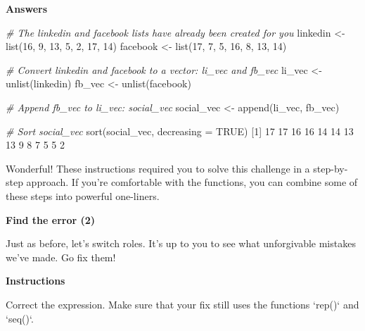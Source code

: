 \documentclass[]{article}
\newcommand{\hlnum}[1]{\textcolor[rgb]{0.816,0.125,0.439}{#1}}%
\newcommand{\hlstr}[1]{\textcolor[rgb]{0.251,0.627,0.251}{#1}}%
\newcommand{\hlcom}[1]{\textcolor[rgb]{0.502,0.502,0.502}{\textit{#1}}}%
\newcommand{\hlstd}[1]{\textcolor[rgb]{0.251,0.251,0.251}{#1}}%
\newcommand{\hlkwc}[1]{\textcolor[rgb]{0.251,0.251,0.251}{#1}}%
\newcommand{\hlkwd}[1]{\textcolor[rgb]{0.878,0.439,0.125}{#1}}%
\newenvironment{Shaded}{\begin{myshaded}}{\end{myshaded}}
\newcommand{\KeywordTok}[1]{\hlkwd{#1}}
\newcommand{\DataTypeTok}[1]{\hlkwc{#1}}
\newcommand{\DecValTok}[1]{\hlnum{#1}}
\newcommand{\StringTok}[1]{\hlstr{#1}}
\newcommand{\CommentTok}[1]{\hlcom{#1}}
\newcommand{\OtherTok}[1]{{#1}}
\newcommand{\NormalTok}[1]{\hlstd{#1}}
\begin{document}
\textbf{Answers}

\begin{Shaded}
\begin{Highlighting}[]
\CommentTok{# The linkedin and facebook lists have already been created for you}
\NormalTok{linkedin <-}\StringTok{ }\KeywordTok{list}\NormalTok{(}\DecValTok{16}\NormalTok{, }\DecValTok{9}\NormalTok{, }\DecValTok{13}\NormalTok{, }\DecValTok{5}\NormalTok{, }\DecValTok{2}\NormalTok{, }\DecValTok{17}\NormalTok{, }\DecValTok{14}\NormalTok{)}
\NormalTok{facebook <-}\StringTok{ }\KeywordTok{list}\NormalTok{(}\DecValTok{17}\NormalTok{, }\DecValTok{7}\NormalTok{, }\DecValTok{5}\NormalTok{, }\DecValTok{16}\NormalTok{, }\DecValTok{8}\NormalTok{, }\DecValTok{13}\NormalTok{, }\DecValTok{14}\NormalTok{)}

\CommentTok{# Convert linkedin and facebook to a vector: li_vec and fb_vec}
\NormalTok{li_vec <-}\StringTok{ }\KeywordTok{unlist}\NormalTok{(linkedin)}
\NormalTok{fb_vec <-}\StringTok{ }\KeywordTok{unlist}\NormalTok{(facebook)}

\CommentTok{# Append fb_vec to li_vec: social_vec}
\NormalTok{social_vec <-}\StringTok{ }\KeywordTok{append}\NormalTok{(li_vec, fb_vec)}

\CommentTok{# Sort social_vec}
\KeywordTok{sort}\NormalTok{(social_vec, }\DataTypeTok{decreasing =} \OtherTok{TRUE}\NormalTok{)}
\NormalTok{    [}\DecValTok{1}\NormalTok{] }\DecValTok{17} \DecValTok{17} \DecValTok{16} \DecValTok{16} \DecValTok{14} \DecValTok{14} \DecValTok{13} \DecValTok{13}  \DecValTok{9}  \DecValTok{8}  \DecValTok{7}  \DecValTok{5}  \DecValTok{5}  \DecValTok{2}
\end{Highlighting}
\end{Shaded}

Wonderful! These instructions required you to solve this challenge in a
step-by-step approach. If you're comfortable with the functions, you can
combine some of these steps into powerful one-liners.

\textbf{Find the error (2)}

Just as before, let's switch roles. It's up to you to see what
unforgivable mistakes we've made. Go fix them!

\textbf{Instructions}

\begin{Shaded}
\begin{Highlighting}[]
\NormalTok{Correct the expression. Make sure that your fix still uses the functions }\StringTok{`}\DataTypeTok{rep()}\StringTok{`}\NormalTok{ and }\StringTok{`}\DataTypeTok{seq()}\StringTok{`}\NormalTok{.}
\end{Highlighting}
\end{Shaded}
\end{document}
